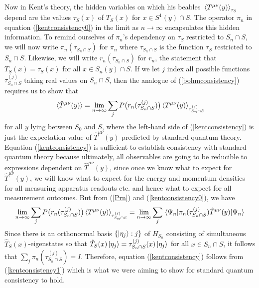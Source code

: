 Now in Kent's theory, the hidden variables on which his beables $\ev*{T^{\mu\nu}(y)}_{\tau_S}$ depend are the values $\tau_S(x)$ of $T_S(x)$ for $x\in S^1(y)\cap S$. The operator $\pi_n$ in equation (\ref{kentconsistency0}) in the limit as $n\rightarrow\infty$ encapsulates this hidden information. To remind ourselves of $\pi_n$'s dependency on $\tau_S$ restricted to $S_n\cap S$, we will now write $\pi_n(\tau_{S_n\cap S})$ for $\pi_n$ where $\tau_{S_n\cap S}$ is the function $\tau_S$ restricted to $S_n\cap S$. Likewise, we will write  $r_n(\tau_{S_n\cap S})$ for $r_n$, the statement that $T_S(x)=\tau_S(x)$ for all $x\in S_n(y)\cap S$. If we let $j$ index all possible functions $\tau^{(j)}_{S_n\cap S}$ taking real values on $S_n\cap S$, then the analogue of (\ref{bohmconsistency}) requires us to show that 
\begin{equation}\label{kentconsistency}
\ev*{\hat{T}^{\mu\nu}(y)}=\lim_{n\rightarrow\infty}\sum_{j}P\big(r_n(\tau^{(j)}_{S_n\cap S})\big)\ev*{T^{\mu\nu}(y)}_{\tau^{(j)}_{S_n\cap S}}
\end{equation}
for all $y$ lying between $S_0$ and $S$, where the left-hand side of (\ref{kentconsistency}) is just the expectation value of $\hat{T}^{\mu\nu}(y)$ predicted by standard quantum theory. Equation (\ref{kentconsistency}) is sufficient to establish consistency with standard quantum theory because ultimately, all observables are going to be reducible to expressions dependent on $\hat{T}^{\mu\nu}(y)$, since once we know what to expect for $\hat{T}^{\mu\nu}(y)$, we will know what to expect for the energy and momentum densities for all measuring apparatus readouts etc. and hence what to expect for all measurement outcomes. But from (\ref{Prn}) and (\ref{kentconsistency0}), we have 
\begin{equation}\label{kentconsistency1}
\lim_{n\rightarrow\infty}\sum_jP\big(r_n(\tau^{(j)}_{S_n\cap S})\big)\ev*{T^{\mu\nu}(y)}_{\tau^{(j)}_{S_n\cap S}}=\lim_{n\rightarrow\infty}\sum_{j}{\ev*{\pi_{n}(\tau^{(j)}_{S_n\cap S})\hat{T}^{\mu\nu}(y)}{\Psi_n}}
\end{equation}
Since there is an orthonormal basis $\{\ket{\eta_j}:j\}$ of $H_{S_n}$ consisting of simultaneous $\hat{T}_S(x)$-eigenstates so that $\hat{T}_S(x)\ket{\eta_j}=\tau^{(j)}_{S_n\cap S}(x)\ket{\eta_j}$ for all $x\in S_n\cap S$, it follows that $\sum_j \pi_{n}(\tau^{(j)}_{S_n\cap S})=I$. Therefore, equation (\ref{kentconsistency}) follows from (\ref{kentconsistency1}) which is what we were aiming to show for standard quantum consistency to hold.




